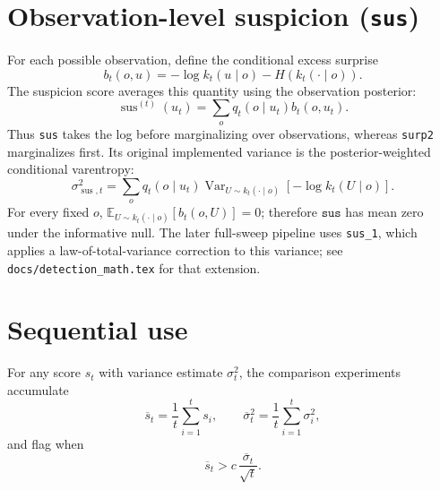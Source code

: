 \documentclass[11pt]{article}
\newcommand{\Var}{\operatorname{Var}}
\newcommand{\E}{\mathbb{E}}
\newcommand{\sus}{\operatorname{sus}}
\begin{document}
\section*{Observation-level suspicion (\texttt{sus})}

For each possible observation, define the conditional excess surprise
\[
    b_t(o,u) = -\log k_t(u\mid o) - H\!\left(k_t(\cdot\mid o)\right).
\]
The suspicion score averages this quantity using the observation posterior:
\[
    \sus^{(t)}(u_t)
    = \sum_o q_t(o\mid u_t)b_t(o,u_t).
\]
Thus \texttt{sus} takes the log before marginalizing over observations,
whereas \texttt{surp2} marginalizes first.  Its original implemented
variance is the posterior-weighted conditional varentropy:
\[
    \sigma_{\sus,t}^2
    = \sum_o q_t(o\mid u_t)
      \Var_{U\sim k_t(\cdot\mid o)}\!\left[-\log k_t(U\mid o)\right].
\]
For every fixed $o$, $\E_{U\sim k_t(\cdot\mid o)}[b_t(o,U)]=0$;
therefore $\texttt{sus}$ has mean zero under the informative null.  The
later full-sweep pipeline uses \texttt{sus\_1}, which applies a
law-of-total-variance correction to this variance; see
\texttt{docs/detection\_math.tex} for that extension.

\section*{Sequential use}

For any score $s_t$ with variance estimate $\sigma_t^2$, the comparison
experiments accumulate
\[
    \overline{s}_t = \frac{1}{t}\sum_{i=1}^t s_i,
    \qquad
    \overline{\sigma}_t^2 = \frac{1}{t}\sum_{i=1}^t \sigma_i^2,
\]
and flag when
\[
    \overline{s}_t > c\,\frac{\overline{\sigma}_t}{\sqrt{t}}.
\]
\end{document}
